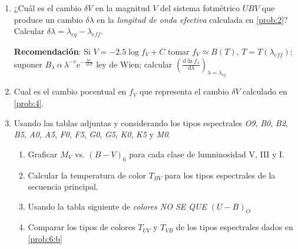 \documentclass[10pt,spanish,a4paper,1p]{practice}
\begin{document}
\begin{enumerate}[wide, labelwidth=!, labelindent=0pt, label=\textbf{\textrm{\arabic*)}}, ref=\arabic*]

    \item \label{prob:4} ¿Cuál es el cambio $\delta V$ en la magnitud $V$ del sistema fotmétrico $UBV$ que produce un cambio $\delta\lambda$ en la \emph{longitud de onda efectiva} calculada en \ref{prob:2}? Calcular $\delta\lambda = {\lambda}_{eq} - {\lambda}_{eff}$.

    \textbf{Recomendación}:
    Si $V = -2.5 \log f_V + C$ tomar $f_V \simeq B\left(T\right) $, $T=T\left({\lambda}_{eff}\right)$; suponer $B_{\lambda}\ \alpha\ {\lambda}^{-v} \mathrm{e}^{-\frac{hc}{\lambda k T}}$ ley de Wien; calcular $\left(\frac{\mathrm{d} \ln {f}_{\lambda}}{\mathrm{d}\lambda}\right)_{\lambda = {\lambda}_{eq}}$

    \item \label{prob:5} Cual es el cambio pocentual en $f_V$ que representa el cambio $\delta V$ calculado en \ref{prob:4}.

    \item \label{prob:6} Usando las tablas adjuntas y considerando los tipos espectrales \emph{O9},
    \emph{B0}, \emph{B2}, \emph{B5}, \emph{A0}, \emph{A5}, \emph{F0}, \emph{F5}, \emph{G0}, \emph{G5}, \emph{K0}, \emph{K5} y \emph{M0}.

      \begin{enumerate}
        \item Graficar $M_V$ vs. $\left(B-V\right)_{0}$ para cada clase de lumninosidad V, III y I.

        \item \label{prob:6:a} Calcular la temperatura de color $T_{BV}$ para los tipos espectrales de la secuencia principal.

        \item \label{prob:6:b} Usando la tabla siguiente de \emph{colores NO SE QUE} $\left(U-B\right)_O$

        \item \label{prob:6:c} Comparar los tipos de colores $T_{UV}$ y $T_{VB}$ de los tipos espectrales dados en \ref{prob:6:b}
      \end{enumerate}
  \end{enumerate}
\end{document}
